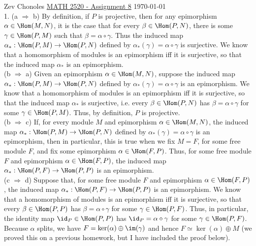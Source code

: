 \documentclass[11pt]{article}
\begin{document}
Zev Chonoles \hfill 
\underline{MATH 2520 - Assignment 8} \hfill \today\\

\num{1.} (a $\Rightarrow$ b) By definition, if $P$ is projective, then for any epimorphism $\alpha\in\Hom(M,N)$, it is the case that for every $\beta\in\Hom(P,N)$, there is some $\gamma\in\Hom(P,M)$ such that $\beta=\alpha\circ\gamma$. Thus the induced map $\alpha_*:\Hom(P,M)\rightarrow\Hom(P,N)$ defined by $\alpha_*(\gamma)=\alpha\circ\gamma$ is surjective. We know that a homomorphism of modules is an epimorphism iff it is surjective, so that the induced map $\alpha_*$ is an epimorphism.\\

(b $\Rightarrow$ a) Given an epimorphism $\alpha\in\Hom(M,N)$, suppose the induced map $\alpha_*:\Hom(P,M)\rightarrow\Hom(P,N)$ defined by $\alpha_*(\gamma)=\alpha\circ\gamma$ is an epimorphism. We know that a homomorphism of modules is an epimorphism iff it is surjective, so that the induced map $\alpha_*$ is surjective, i.e. every $\beta\in\Hom(P,N)$ has $\beta=\alpha\circ\gamma$ for some $\gamma\in\Hom(P,M)$. Thus, by definition, $P$ is projective.\\

(b $\Rightarrow$ c) If, for every module $M$ and epimorphism $\alpha\in\Hom(M,N)$, the induced map $\alpha_*:\Hom(P,M)\rightarrow\Hom(P,N)$ defined by $\alpha_*(\gamma)=\alpha\circ\gamma$ is an epimorphism, then in particular, this is true when we fix $M=F$, for some free module $F$, and fix some epimorphism $\alpha\in\Hom(F,P)$. Thus, for some free module $F$ and epimorphism $\alpha\in\Hom(F,P)$, the induced map $\alpha_*:\Hom(P,F)\rightarrow\Hom(P,P)$ is an epimorphism.\\

(c $\Rightarrow$ d) Suppose that, for some free module $F$ and epimorphism $\alpha\in\Hom(F,P)$, the induced map $\alpha_*:\Hom(P,F)\rightarrow\Hom(P,P)$ is an epimorphism. We know that a homomorphism of modules is an epimorphism iff it is surjective, so that every $\beta\in\Hom(P,P)$ has $\beta=\alpha\circ\gamma$ for some $\gamma\in\Hom(P,F)$. Thus, in particular, the identity map $\id_P\in\Hom(P,P)$ has $\id_P=\alpha\circ\gamma$ for some $\gamma\in\Hom(P,F)$. Because $\alpha$ splits, we have $F=\ker(\alpha)\oplus\im(\gamma)$ and hence $F\simeq\ker(\alpha)\oplus M$ (we proved this on a previous homework, but I have included the proof below).\\
\end{document}

